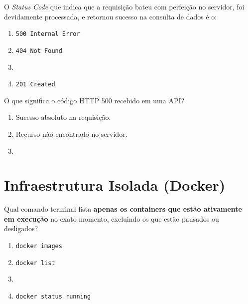 \documentclass[12pt,a4paper]{article}
\newcommand{\correto}[1]{\iftoggle{gabarito}{\textbf{\color{corGabarito}#1}}{#1}}
\begin{document}
\begin{tcolorbox}[colback=white, colframe=azulTitulo, title=Questão 24]
    O \textit{Status Code} que indica que a requisição bateu com perfeição no servidor, foi devidamente processada, e retornou sucesso na consulta de dados é o:
    \begin{enumerate}[label=\alph*)]
        \item \texttt{500 Internal Error}
        \item \texttt{404 Not Found}
        \item \correto{\texttt{200 OK}}
        \item \texttt{201 Created}
    \end{enumerate}
\end{tcolorbox}

\begin{tcolorbox}[colback=azulTitulo!5, colframe=azulTitulo, title=Questão 25]
    O que significa o código HTTP 500 recebido em uma API?
    \begin{enumerate}[label=\alph*)]
        \item Sucesso absoluto na requisição.
        \item Recurso não encontrado no servidor.
        \item \correto{Erro interno no servidor (problema no código Backend).}
    \end{enumerate}
\end{tcolorbox}

\newpage
\section{Infraestrutura Isolada (Docker)}

\begin{tcolorbox}[colback=white, colframe=azulTitulo, title=Questão 26]
    Qual comando terminal lista \textbf{apenas os containers que estão ativamente em execução} no exato momento, excluindo os que estão pausados ou desligados?
    \begin{enumerate}[label=\alph*)]
        \item \texttt{docker images}
        \item \texttt{docker list}
        \item \correto{\texttt{docker ps}}
        \item \texttt{docker status running}
    \end{enumerate}
\end{tcolorbox}
\end{document}
